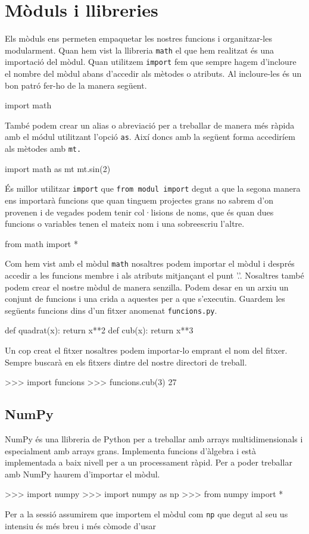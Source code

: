 \chapter{Mòduls i llibreries}
Els mòduls ens permeten empaquetar les nostres funcions i organitzar-les modularment. Quan hem vist la llibreria {\tt math} el que hem realitzat és una importació del mòdul. Quan utilitzem {\tt import} fem que sempre hagem d'incloure el nombre del mòdul abans d'accedir als mètodes o atributs. Al incloure-les és un bon patró fer-ho de la manera següent.
\begin{blockcode}
import math
\end{blockcode}
També podem crear un alias o abreviació per a treballar de manera més ràpida amb el módul utilitzant l'opció {\tt as}. Així doncs amb la següent forma accediríem als mètodes amb {\tt mt.} 
\begin{blockcode}
import math as mt
mt.sin(2)
\end{blockcode}
És millor utilitzar {\tt import} que {\tt from modul import} degut a que la segona manera ens importarà funcions que quan tinguem projectes grans no sabrem d'on provenen i de vegades podem tenir col·lisions de noms, que és quan dues funcions o variables tenen el mateix nom i una sobreescriu l'altre.
\begin{blockcode}
from math import *
\end{blockcode}
Com hem vist amb el mòdul {\tt math} nosaltres podem importar el mòdul i després accedir a les funcions membre i als atributs mitjançant el punt '.'. Nosaltres també podem crear el nostre mòdul de manera senzilla. Podem desar en un arxiu un conjunt de funcions i una crida a aquestes per a que s'executin. Guardem les següents funcions dins d'un fitxer anomenat {\tt funcions.py}.
\begin{blockcode}
def quadrat(x):
    return x**2
def cub(x):
    return x**3
\end{blockcode}
Un cop creat el fitxer nosaltres podem importar-lo emprant el nom del fitxer. Sempre buscarà en els fitxers dintre del nostre directori de treball. 
\begin{blockcode}
>>> import funcions
>>> funcions.cub(3)
27
\end{blockcode}
\section{NumPy}
NumPy és una llibreria de Python per a treballar amb arrays multidimensionals i especialment amb arrays grans. Implementa funcions d'àlgebra i està implementada a baix nivell per a un processament ràpid. Per a poder treballar amb NumPy haurem d'importar el mòdul.
\begin{blockcode}
>>> import numpy
>>> import numpy as np 
>>> from numpy import * 
\end{blockcode}
Per a la sessió assumirem que importem el mòdul com {\tt np} que degut al seu us intensiu és més breu i més còmode d'usar
